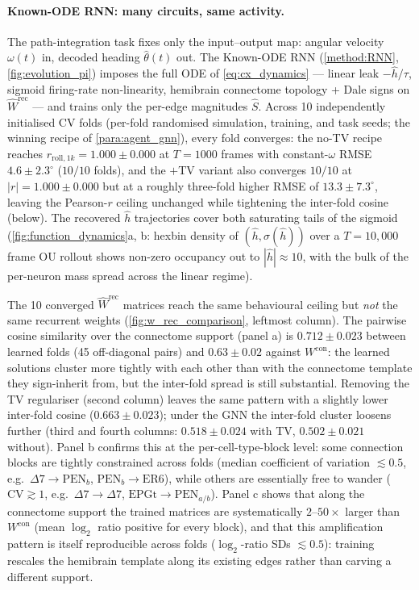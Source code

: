 \documentclass[11pt]{article}
\begin{document}
\paragraph{Known-ODE RNN: many circuits, same activity.}
The path-integration task fixes only the input--output map: angular
velocity $\omega(t)$ in, decoded heading $\hat \theta(t)$ out. The
Known-ODE RNN (\cref{method:RNN}, \cref{fig:evolution_pi}) imposes
the full ODE of \cref{eq:cx_dynamics} --- linear leak $-\hat h/\tau$,
sigmoid firing-rate non-linearity, hemibrain connectome topology +
Dale signs on $\hat W^{\mathrm{rec}}$ --- and trains only the
per-edge magnitudes $\hat S$. Across 10 independently initialised CV
folds (per-fold randomised simulation, training, and task seeds; the
winning recipe of \cref{para:agent_gnn}), every fold converges: the no-TV recipe reaches $r_{\mathrm{roll},1k} = 1.000 \pm 0.000$ at $T = 1000$ frames with constant-$\omega$ RMSE $4.6 \pm 2.3^\circ$ ($10/10$ folds), and the $+$TV variant also converges $10/10$ at $|r| = 1.000 \pm 0.000$ but at a roughly three-fold higher RMSE of $13.3 \pm 7.3^\circ$, leaving the Pearson-$r$ ceiling unchanged while tightening the inter-fold cosine (below). The
recovered $\hat h$ trajectories cover both saturating tails of the
sigmoid (\cref{fig:function_dynamics}a, b: hexbin density of
$(\hat h, \sigma(\hat h))$ over a $T = 10{,}000$ frame OU rollout
shows non-zero occupancy out to $|\hat h| \approx 10$, with the bulk
of the per-neuron mass spread across the linear regime).

The 10 converged $\hat W^{\mathrm{rec}}$ matrices reach the same
behavioural ceiling but \emph{not} the same recurrent weights
(\cref{fig:w_rec_comparison}, leftmost column). The pairwise cosine
similarity over the connectome support (panel a) is $0.712 \pm
0.023$ between learned folds (45 off-diagonal pairs) and
$0.63 \pm 0.02$ against $W^{\mathrm{con}}$: the learned solutions
cluster more tightly with each other than with the connectome
template they sign-inherit from, but the inter-fold spread is still
substantial. Removing the TV regulariser (second column) leaves the
same pattern with a slightly lower inter-fold cosine ($0.663 \pm
0.023$); under the GNN the inter-fold cluster loosens further (third
and fourth columns: $0.518 \pm 0.024$ with TV, $0.502 \pm 0.021$
without). Panel b confirms
this at the per-cell-type-block level: some connection blocks are
tightly constrained across folds (median coefficient of variation
$\lesssim 0.5$, e.g.\ $\Delta 7 \to \mathrm{PEN}_b$,
$\mathrm{PEN}_b \to \mathrm{ER6}$), while others are essentially
free to wander ($\mathrm{CV} \gtrsim 1$, e.g.\ $\Delta 7 \to \Delta
7$, $\mathrm{EPGt} \to \mathrm{PEN}_{a/b}$). Panel c shows that
along the connectome support the trained matrices are systematically
$2$--$50\times$ larger than $W^{\mathrm{con}}$ (mean $\log_2$ ratio
positive for every block), and that this amplification pattern is
itself reproducible across folds ($\log_2$-ratio SDs $\lesssim
0.5$): training rescales the hemibrain template along its existing
edges rather than carving a different support.
\end{document}
